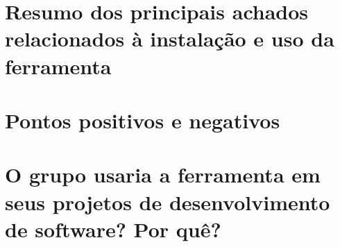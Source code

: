 \section{Resumo dos principais achados relacionados à instalação e uso da ferramenta}
\section{Pontos positivos e negativos}
\section{O grupo usaria a ferramenta em seus projetos de desenvolvimento de software? Por quê?}

